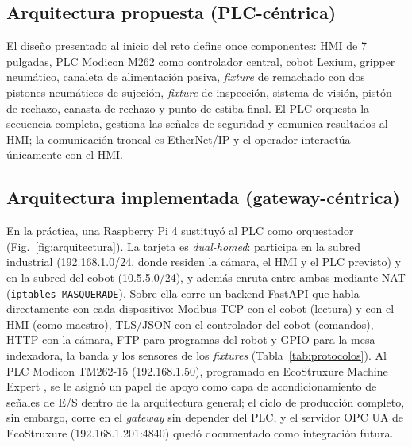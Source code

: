 \documentclass{styles/svproc}
\begin{document}
\subsection{Arquitectura propuesta (PLC-céntrica)}
El diseño presentado al inicio del reto define once componentes: HMI de
7 pulgadas, PLC Modicon M262 como controlador central, cobot Lexium,
gripper neumático, canaleta de alimentación pasiva, \emph{fixture} de
remachado con dos pistones neumáticos de sujeción, \emph{fixture} de
inspección, sistema de visión, pistón de rechazo, canasta de rechazo y punto
de estiba final. El PLC orquesta la secuencia completa, gestiona las señales
de seguridad y comunica resultados al HMI; la comunicación troncal es
EtherNet/IP y el operador interactúa únicamente con el HMI.

\subsection{Arquitectura implementada (gateway-céntrica)}
En la práctica, una Raspberry Pi 4 sustituyó al PLC como orquestador
(Fig.~\ref{fig:arquitectura}). La tarjeta es \emph{dual-homed}: participa en
la subred industrial (192.168.1.0/24, donde residen la cámara, el HMI y el
PLC previsto) y en la subred del cobot (10.5.5.0/24), y además enruta entre
ambas mediante NAT (\texttt{iptables MASQUERADE}). Sobre ella corre un
backend FastAPI \cite{fastapi} que habla directamente con cada dispositivo:
Modbus TCP con el cobot (lectura) y con el HMI (como maestro), TLS/JSON con
el controlador del cobot (comandos), HTTP con la cámara, FTP para programas
del robot y GPIO para la mesa indexadora, la banda y los sensores de los
\emph{fixtures} (Tabla~\ref{tab:protocolos}). Al PLC Modicon TM262-15
(192.168.1.50), programado en EcoStruxure Machine Expert \cite{iec61131}, se
le asignó un papel de apoyo como capa de acondicionamiento de señales de
E/S dentro de la arquitectura general; el ciclo de producción completo, sin
embargo, corre en el \emph{gateway} sin depender del PLC, y el servidor OPC
UA de EcoStruxure (192.168.1.201:4840) quedó documentado como integración
futura.
\end{document}
